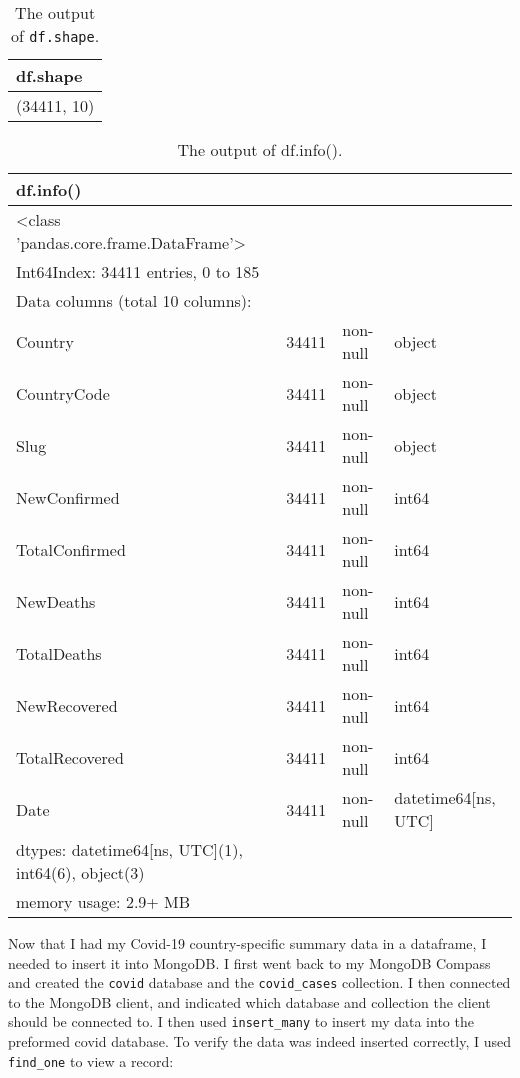 \documentclass[]{article}
\newcommand{\code}[1]{\colorbox{light-gray}{\texttt{#1}}}
\begin{document}
\begin{table}[!ht]
	\begin{center}
		\caption{The output of \code{df.shape}.}
		\label{tab:table1}
		\begin{tabular}{|l|} 
			\hline
			\textbf{df.shape} \\
			\hline
			(34411, 10)  \\
			\hline
		\end{tabular}
	\end{center}
\end{table}
\pagebreak
\begin{table}[!ht]
	\begin{center}
		\caption{The output of df.info().}
		\label{tab:table1}
		\begin{tabular}{|l|lll|} 
			\hline
			\textbf{df.info()} &&&\\
			\hline
<class 'pandas.core.frame.DataFrame'>&&&\\
Int64Index: 34411 entries, 0 to 185&&&\\
Data columns (total 10 columns):&&&\\
Country         &  34411 &non-null &object\\
CountryCode      & 34411 &non-null& object\\
Slug              &34411 &non-null &object\\
NewConfirmed      &34411 &non-null &int64\\
TotalConfirmed    &34411 &non-null &int64\\
NewDeaths         &34411 &non-null &int64\\
TotalDeaths       &34411 &non-null& int64\\
NewRecovered      &34411 &non-null& int64\\
TotalRecovered    &34411& non-null &int64\\
Date              &34411 &non-null& datetime64[ns, UTC]\\
dtypes: datetime64[ns, UTC](1), int64(6), object(3)&&&\\
memory usage: 2.9+ MB&&&\\
			\hline
		\end{tabular}
	\end{center}
\end{table}

Now that I had my Covid-19 country-specific summary data in a dataframe, I needed to insert it into MongoDB.  I first went back to my MongoDB Compass and created the \code{covid} database and the \code{covid\_cases} collection.  I then connected to the MongoDB client, and indicated which database and collection the client should be connected to.  I then used \code{insert\_many} to insert my data into the preformed covid database.  To verify the data was indeed inserted correctly, I used \code{find\_one} to view a record:
\end{document}
